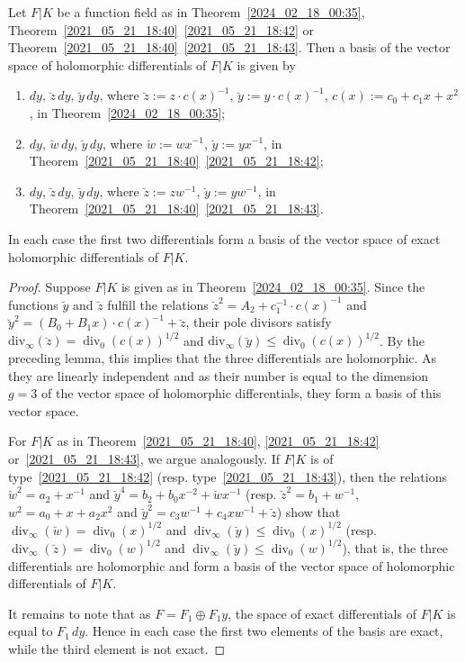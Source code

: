\documentclass[10pt,a4paper]{amsart}
\DeclareMathOperator{\divv}{div}%
\begin{document}
\begin{prop}\label{2024_08_04_19:35}
Let $F|K$ be a function field as in Theorem~\ref{2024_02_18_00:35}, Theorem~\ref{2021_05_21_18:40}~\ref{2021_05_21_18:42} or Theorem~\ref{2021_05_21_18:40}~\ref{2021_05_21_18:43}.
Then a basis of the vector space of holomorphic differentials of $F|K$ is given by
\begin{enumerate}[\upshape (a)]
    \item $dy, \, \breve z \, dy, \, \breve y \, dy$, where $\breve z:= z \cdot c(x)^{-1}$, $\breve y := y \cdot c(x)^{-1}$, $c(x) := c_0 + c_1 x + x^2$, in Theorem~\ref{2024_02_18_00:35};
    \item $dy$, $\breve w \, dy$, $\breve y \, dy$, where $\breve w := wx^{-1}$, $\breve y := y x^{-1}$, in Theorem~\ref{2021_05_21_18:40}~\ref{2021_05_21_18:42};
    \item $dy$, $\breve z \, dy$, $\breve y \, dy$, where $\breve z := zw^{-1}$, $\breve y := yw^{-1}$, in Theorem~\ref{2021_05_21_18:40}~\ref{2021_05_21_18:43}.
\end{enumerate}
In each case the first two differentials form a basis of the vector space of exact holomorphic differentials of $F|K$.
\end{prop}

\begin{proof}
Suppose $F|K$ is given as in Theorem~\ref{2024_02_18_00:35}.
Since the functions $\breve y$ and $\breve z$ fulfill the relations $\breve z^2 = A_2 + c_1^{-1} \cdot c(x)^{-1}$ and $\breve y^2 = (B_0 + B_1 x) \cdot c(x)^{-1} + \breve z$,
their pole divisors satisfy $\mathrm{div}_\infty(\breve z) = \divv_0(c(x))^{1/2}$ and $\mathrm{div}_\infty(\breve y) \leq \divv_0(c(x))^{1/2}$.
By the preceding lemma, this implies that the three differentials are holomorphic. As they are linearly independent and as their number is equal to the dimension $g=3$ of the vector space of holomorphic differentials, they form a basis of this vector space.

For $F|K$ as in Theorem~\ref{2021_05_21_18:40}, \ref{2021_05_21_18:42} or~\ref{2021_05_21_18:43}, we argue analogously.
If $F|K$ is of type~\ref{2021_05_21_18:42} (resp. type~\ref{2021_05_21_18:43}), then the relations
$\breve w^2 = a_2 + x^{-1}$ and $\breve y^4 = b_2 + b_0 x^{-2} + \breve w x^{-1}$
(resp. $\breve z^2 = b_1 + w^{-1}$, $w^2 = a_0 + x + a_2 x^2$ and $\breve y^2 = c_3 w^{-1} + c_4 x w^{-1} + \breve z$)
show that
$\divv_\infty(\breve w) = \divv_0(x)^{1/2}$ and $\divv_\infty(\breve y) \leq \divv_0(x)^{1/2}$
(resp. $\divv_\infty (\breve z) = \divv_0(w)^{1/2}$ and $\divv_\infty(\breve y)\leq \divv_0(w)^{1/2}$),
that is, the three differentials are holomorphic and form a basis of the vector space of holomorphic differentials of $F|K$.

It remains to note that as $F=F_1 \oplus F_1 y$, the space of exact differentials of $F|K$ is equal to $F_1 \, dy$.
Hence in each case the first two elements of the basis are exact, while the third element is not exact.
\end{proof}
\end{document}
